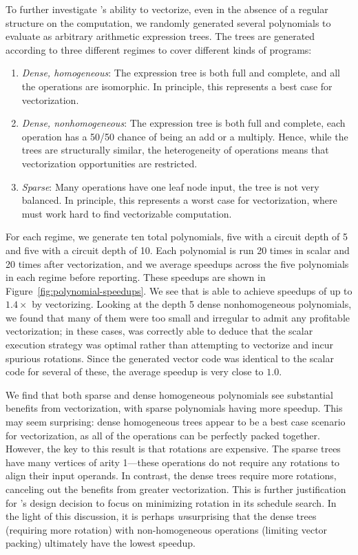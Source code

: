 To further investigate \system's ability to vectorize, even in the absence of a regular structure on the computation, we randomly generated several polynomials to evaluate as arbitrary arithmetic expression trees.
The trees are generated according to three different regimes to cover different kinds of programs: 
\begin{enumerate}
    \item {\em Dense, homogeneous}: The expression tree is both full and complete, and all the operations are isomorphic. In principle, this represents a best case for vectorization.
    \item {\em Dense, nonhomogeneous}: The expression tree is both full and complete, each operation has a 50/50 chance of being an add or a multiply. Hence, while the trees are structurally similar, the heterogeneity of operations means that vectorization opportunities are restricted.
	\item {\em Sparse}: Many operations have one leaf node input, the tree is not very balanced. In principle, this represents a worst case for vectorization, where \system must work hard to find vectorizable computation.
\end{enumerate}
For each regime, we generate ten total polynomials, five with a circuit depth of 5 and five with a circuit depth of 10.
Each polynomial is run 20 times in scalar and 20 times after vectorization, and we average speedups across the five polynomials in each regime before reporting.
These speedups are shown in Figure~\ref{fig:polynomial-speedups}.
We see that \system is able to achieve speedups of up to $1.4\times$ by vectorizing.
Looking at the depth 5 dense nonhomogeneous polynomials, we found that many of them were too small and irregular to admit any profitable vectorization; in these cases, \system was correctly able to deduce that the scalar execution strategy was optimal rather than attempting to vectorize and incur spurious rotations.
Since the generated vector code was identical to the scalar code for several of these, the average speedup is very close to $1.0$.

We find that both sparse and dense homogeneous polynomials see substantial benefits from vectorization, with sparse polynomials having more speedup. This may seem surprising: dense homogeneous trees appear to be a best case scenario for vectorization, as all of the operations can be perfectly packed together. However, the key to this result is that rotations are expensive. The sparse trees have many vertices of arity 1---these operations do not require any rotations to align their input operands. In contrast, the dense trees require more rotations, canceling out the benefits from greater vectorization. This is further justification for \system's design decision to focus on minimizing rotation in its schedule search. In the light of this discussion, it is perhaps {\em un}surprising that the dense trees (requiring more rotation) with non-homogeneous operations (limiting vector packing) ultimately have the lowest speedup.


